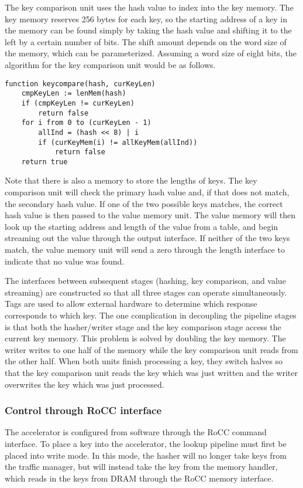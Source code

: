The key comparison unit uses the hash value to index into the key memory.
The key memory reserves 256 bytes for each key, so the starting address of a
key in the memory can be found simply by taking the hash value and shifting it
to the left by a certain number of bits. The shift amount depends on the
word size of the memory, which can be parameterized. Assuming a word size
of eight bits, the algorithm for the key comparison unit would be as follows.

{\footnotesize
\begin{verbatim}
function keycompare(hash, curKeyLen)
    cmpKeyLen := lenMem(hash)
    if (cmpKeyLen != curKeyLen)
        return false
    for i from 0 to (curKeyLen - 1)
        allInd = (hash << 8) | i
        if (curKeyMem(i) != allKeyMem(allInd))
            return false
    return true
\end{verbatim}
}

Note that there is also a memory to store the lengths of keys.
The key comparison unit will check the primary hash value and, if that does
not match, the secondary hash value. If one of the two possible keys matches,
the correct hash value is then passed to the value memory unit. The value
memory will then look up the starting address and length of the value from a
table, and begin streaming out the value through the output interface.
If neither of the two keys match, the value memory unit will send
a zero through the length interface to indicate that no value was found.

The interfaces between subsequent stages (hashing, key comparison,
and value streaming) are constructed so that all three stages can operate
simultaneously. Tags are used to allow external hardware to determine which
response corresponds to which key. The one complication in decoupling the
pipeline stages is that both the hasher/writer stage and the key comparison
stage access the current key memory. This problem is solved by doubling the
key memory. The writer writes to one half of the memory while the key
comparison unit reads from the other half. When both units finish processing
a key, they switch halves so that the key comparison unit reads the key which
was just written and the writer overwrites the key which was just processed.

\subsubsection{Control through RoCC interface}

The accelerator is configured from software through the RoCC command interface.
To place a key into the accelerator, the lookup pipeline must first be
placed into write mode. In this mode, the hasher will no longer take keys
from the traffic manager, but will instead take the key from the memory handler,
which reads in the keys from DRAM through the RoCC memory interface.


